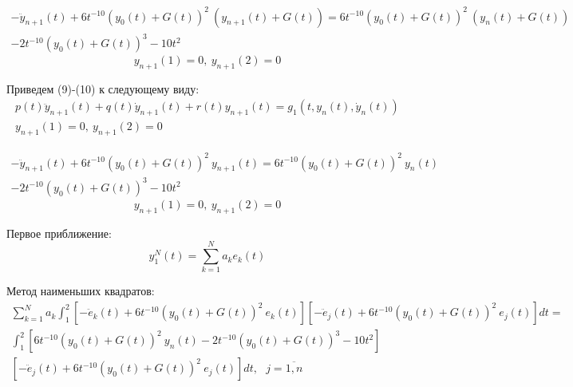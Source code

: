\documentclass[12pt]{article}
\begin{document}
\begin{multline}
-\ddot{y}_{n+1}(t) + 6t^{-10}(y_0(t) + G(t))^2\ (y_{n+1}(t) + G(t)) = 
 6t^{-10}(y_0(t) + G(t))^2\ (y_n(t) + G(t)) \\- 2t^{-10}(y_0(t) + G(t))^3 - 10t^2
\end{multline}
\begin{equation}
y_{n+1}(1)=0,\ y_{n+1}(2)=0
\end{equation}

Приведем (9)-(10) к следующему виду:
\begin{gather}
p(t)\ddot{y}_{n+1}(t) + q(t)\dot{y}_{n+1}(t) + r(t)y_{n+1}(t) = g_1(t, y_n(t), \dot{y}_n(t)) \\
y_{n+1}(1) = 0,\ y_{n+1}(2) = 0
\end{gather}

\begin{multline}
-\ddot{y}_{n+1}(t) + 6t^{-10}(y_0(t) + G(t))^2\ y_{n+1}(t) = 
6t^{-10}(y_0(t) + G(t))^2\ y_n(t) \\- 2t^{-10}(y_0(t) + G(t))^3 - 10t^2
\end{multline}
\begin{equation}
y_{n+1}(1) = 0,\ y_{n+1}(2) = 0
\end{equation}

Первое приближение:
\begin{equation}
y_1^N(t) = \sum_{k = 1}^{N}a_ke_k(t)
\end{equation}

Метод наименьших квадратов:
\begin{multline}
\sum_{k = 1}^{N}a_k \int_1^2 [-\ddot{e}_k(t) + 6t^{-10}(y_0(t) + G(t))^2\ e_k(t)]
[-\ddot{e}_j(t) + 6t^{-10}(y_0(t) + G(t))^2\ e_j(t)]dt = \\
\int_1^2[6t^{-10}(y_0(t)+G(t))^2\ y_n(t) - 2t^{-10}(y_0(t)+G(t))^3 - 10t^2]\\ [-\ddot{e}_j(t) + 6t^{-10}(y_0(t) + G(t))^2\ e_j(t)]dt,\ \ \ 
j = \overline{1,n} 
\end{multline}
\end{document}
